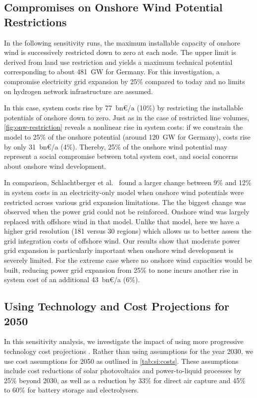 \subsection{Compromises on Onshore Wind Potential Restrictions}
\label{sec:si:onw-compromise}

In the following sensitivity runs, the maximum installable capacity of onshore
wind is successively restricted down to zero at each node. The upper limit is
derived from land use restriction and yields a maximum technical potential
corresponding to about \SI{481}{\giga\watt} for Germany. For this investigation,
a compromise electricity grid expansion by 25\% compared to today and no limits
on hydrogen network infrastructure are assumed.

In this case, system costs rise by 77~bn\euro/a (10\%)
by restricting the installable potentials of onshore down to zero. Just as in
the case of restricted line volumes, \cref{fig:onw-restriction} reveals a
nonlinear rise in system costs: if we constrain the model to 25\% of the onshore
potential (around 120~GW for Germany), costs rise by only 31~bn\euro/a (4\%).
Thereby, 25\% of the onshore wind potential may represent a social compromise
between total system cost, and social concerns about onshore wind development.

In comparison, Schlachtberger et al.~ found
a larger change between 9\% and 12\% in system costs in an electricity-only
model when onshore wind potentials were restricted across various grid expansion
limitations. The the biggest change was observed when the power grid could not
be reinforced. Onshore wind was largely replaced with offshore wind in that
model. Unlike that model, here we have a higher grid resolution (181 versus 30
regions) which allows us to better assess the grid integration costs of offshore
wind. Our results show that moderate power grid expansion is particularly
important when onshore wind development is severely limited. For the extreme
case where no onshore wind capacities would be built, reducing power grid
expansion from 25\% to none incurs another rise in system cost of an additional
43~bn\euro/a (6\%).

\subsection{Using Technology and Cost Projections for 2050}
\label{sec:si:sensitivity-costs}

In this sensitivity analysis, we investigate the impact of using more
progressive technology cost projections .
Rather than using assumptions for the year 2030, we use cost assumptions for
2050 as outlined in \cref{tab:si:costs}. These assumptions include cost
reductions of solar photovoltaics and power-to-liquid processes by 25\% beyond
2030, as well as a reduction by 33\% for direct air capture and 45\% to 60\% for
battery storage and electrolysers.

